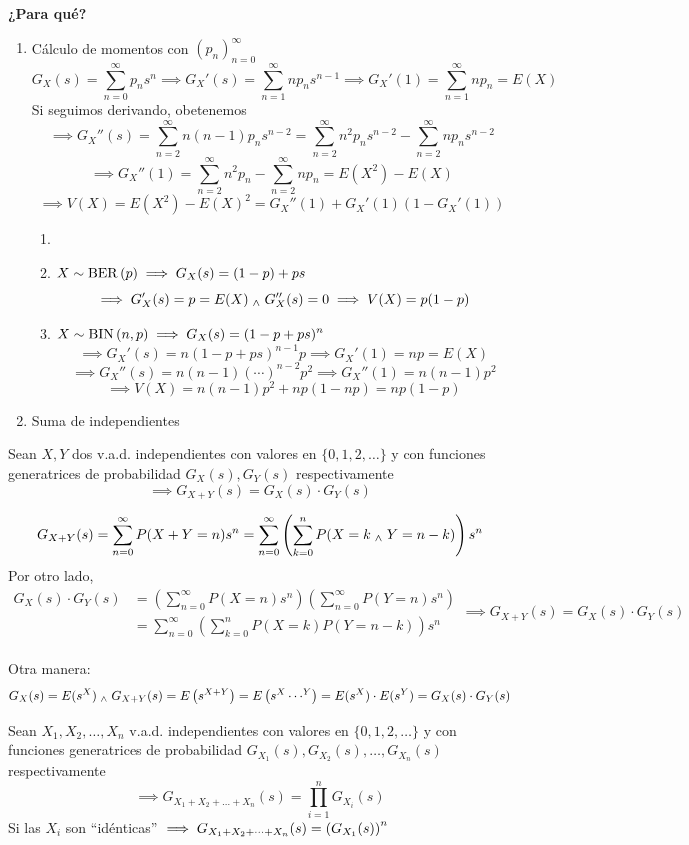 \textbf{¿Para qué?}
\begin{enumerate}
	\item Cálculo de momentos con $(p_n)_{n=0}^\infty$
	      \[ G_X(s)=\sum_{n=0}^\infty p_ns^n \implies G_X'(s) = \sum_{n=1}^{\infty} np_n s^{n-1} \implies G_X'(1) = \sum_{n=1}^{\infty} n p_n = E(X)\]
	      Si seguimos derivando, obetenemos
	      \[\implies G_X''(s)= \sum_{n=2}^{\infty} n(n-1) p_n s^{n-2} = \sum_{n=2}^{\infty} n^2 p_n s^{n-2} - \sum_{n=2}^{\infty} n p_n s^{n-2}\]
	      \[\implies G_X''(1) = \sum_{n=2}^{\infty} n^2 p_n - \sum_{n=2}^{\infty} n p_n = E(X^2) - E(X)\]
	      \[\implies V(X)=E(X^2) - E(X)^2 = G_X''(1) + G_X'(1)\left(1-G_X'(1)\right)\]
	      \begin{ejem}
		      \begin{enumerate}
			      \item[]
			      \item $\displaystyle X\sim\operatorname{BER}\left(p\right) \implies G_X(s)=(1-p)+ps$
			            \[\implies G_X'(s)=p=E(X) \; _{\wedge} \; G_X''(s)=0 \implies V(X)=p(1-p)\]
			      \item $\displaystyle X\sim\operatorname{BIN}\left(n, p\right) \implies G_X(s)=(1-p+ps)^n$ \[\implies G_X'(s)=n(1-p+ps)^{n-1}p \implies G_X'(1)=np=E(X)\]
			            \[\implies G_X''(s)=n(n-1)(\cdots)^{n-2}p^2 \implies G_X''(1)=n(n-1)p^2\]
			            \[\implies V(X)=n(n-1)p^2+np(1-np)=np(1-p)\]

		      \end{enumerate}
	      \end{ejem}
	\item Suma de independientes
\end{enumerate}
\begin{teo}
	Sean $X, Y$ dos v.a.d. independientes con valores en $\{0, 1, 2, \dots\}$ y con funciones generatrices de probabilidad $G_X(s), G_Y(s)$ respectivamente
	\[\implies G_{X+Y}(s)=G_X(s)\cdot G_Y(s)\]
	\begin{dem}
		\[G_{X+Y}(s)=\sum_{n=0}^\infty P(X+Y=n)s^n = \sum_{n=0}^\infty \left(\sum_{k=0}^n P(X=k \; _{\wedge} \; Y=n-k)\right)s^n\]
		Por otro lado,
		\[\begin{aligned}G_X(s)\cdot G_Y(s) & = \left(\sum_{n=0}^\infty P(X=n)s^n\right)\left(\sum_{n=0}^\infty P(Y=n)s^n\right) \\
                                  & = \sum_{n=0}^\infty \left(\sum_{k=0}^n P(X=k)P(Y=n-k)\right)s^n\end{aligned}\implies G_{X+Y}(s)=G_X(s)\cdot G_Y(s)\]
		\hfill \qedsymbol\\
		Otra manera:
		\[G_X(s)=E(s^X) \; _{\wedge} \; G_{X+Y}(s)=E\left(s^{X+Y}\right) = E\left(s^X\cdots^Y\right)=E(s^X)\cdot E(s^Y) = G_X(s)\cdot G_Y(s)\]
	\end{dem}
\end{teo}
\begin{cor}
	Sean $X_1, X_2, \dots, X_n$ v.a.d. independientes con valores en $\{0, 1, 2, \dots\}$ y con funciones generatrices de probabilidad $G_{X_1}(s), G_{X_2}(s), \dots, G_{X_n}(s)$ respectivamente
	\[\implies G_{X_1+X_2+\dots+X_n}(s)=\prod_{i=1}^{n} G_{X_i}(s)\]
	Si las $X_i$ son ``idénticas'' $\displaystyle \implies
		G_{X_1+X_2+\dots+X_n}(s)=\left(G_{X_1}(s)\right)^n$
\end{cor}

